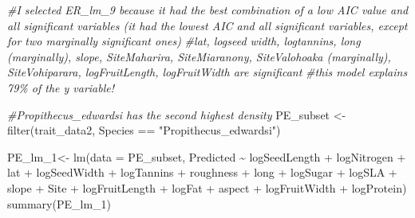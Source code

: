 \documentclass[
  12pt,
]{article}
\newenvironment{Shaded}{\begin{snugshade}}{\end{snugshade}}
\newcommand{\AttributeTok}[1]{\textcolor[rgb]{0.77,0.63,0.00}{#1}}
\newcommand{\CommentTok}[1]{\textcolor[rgb]{0.56,0.35,0.01}{\textit{#1}}}
\newcommand{\FunctionTok}[1]{\textcolor[rgb]{0.00,0.00,0.00}{#1}}
\newcommand{\NormalTok}[1]{#1}
\newcommand{\OtherTok}[1]{\textcolor[rgb]{0.56,0.35,0.01}{#1}}
\newcommand{\SpecialCharTok}[1]{\textcolor[rgb]{0.00,0.00,0.00}{#1}}
\newcommand{\StringTok}[1]{\textcolor[rgb]{0.31,0.60,0.02}{#1}}
\begin{document}
\begin{Shaded}
\begin{Highlighting}[]
\CommentTok{\#I selected ER\_lm\_9 because it had the best combination of a low AIC value and all significant variables (it had the lowest AIC and all significant variables, except for two marginally significant ones)}
\CommentTok{\#lat, logseed width, logtannins, long (marginally), slope, SiteMaharira, SiteMiaranony, SiteValohoaka (marginally), SiteVohiparara, logFruitLength, logFruitWidth are significant}
\CommentTok{\#this model explains 79\% of the y variable!}

\CommentTok{\#Propithecus\_edwardsi has the second highest density}
\NormalTok{PE\_subset }\OtherTok{\textless{}{-}} \FunctionTok{filter}\NormalTok{(trait\_data2, Species }\SpecialCharTok{==} \StringTok{"Propithecus\_edwardsi"}\NormalTok{)}

\NormalTok{PE\_lm\_1}\OtherTok{\textless{}{-}} \FunctionTok{lm}\NormalTok{(}\AttributeTok{data =}\NormalTok{ PE\_subset, Predicted }\SpecialCharTok{\textasciitilde{}}\NormalTok{ logSeedLength }\SpecialCharTok{+}\NormalTok{ logNitrogen }\SpecialCharTok{+}\NormalTok{ lat }\SpecialCharTok{+}\NormalTok{ logSeedWidth }\SpecialCharTok{+}\NormalTok{ logTannins }\SpecialCharTok{+}\NormalTok{ roughness }\SpecialCharTok{+}\NormalTok{ long }\SpecialCharTok{+}\NormalTok{ logSugar }\SpecialCharTok{+}\NormalTok{ logSLA }\SpecialCharTok{+}\NormalTok{ slope }\SpecialCharTok{+}\NormalTok{ Site }\SpecialCharTok{+}\NormalTok{ logFruitLength }\SpecialCharTok{+}\NormalTok{ logFat }\SpecialCharTok{+}\NormalTok{ aspect }\SpecialCharTok{+}\NormalTok{ logFruitWidth }\SpecialCharTok{+}\NormalTok{ logProtein)}
\FunctionTok{summary}\NormalTok{(PE\_lm\_1)}
\end{Highlighting}
\end{Shaded}
\end{document}
